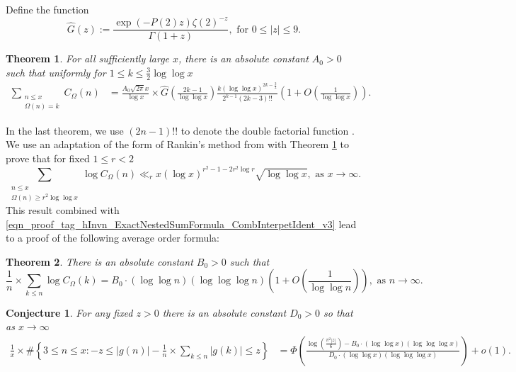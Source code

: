 \documentclass[11pt,reqno,a4letter]{article}
\newcommand{\hlocalref}[1]{\hyperref[#1]{\ref{#1}}}
\numberwithin{equation}{section}
\numberwithin{figure}{section}
\numberwithin{table}{section}
\newcommand{\seqnum}[1]{\href{http://oeis.org/#1}{\color{ProcessBlue}{\underline{#1}}}}
\theoremstyle{plain}
\newtheorem{theorem}{Theorem}
\numberwithin{theorem}{section}
\newtheorem*{conjecture*}{Conjecture}
\theoremstyle{definition}
\begin{document}
Define the function 
\[
\widehat{G}(z) := \frac{\exp\left(-P(2) z\right) \zeta(2)^{-z}}{\Gamma(1+z)}, \text{ for } 
     0 \leq |z| \leq 9.
\]

\begin{theorem} 
\label{cor_SummatoryFuncsOfUnsignedSeqs_v2} 
For all sufficiently large $x$, there is an absolute constant $A_0 > 0$ such that 
uniformly for $1 \leq k \leq \frac{3}{2} \log\log x$  
\begin{align*} 
\sum_{\substack{n \leq x \\ \Omega(n)=k}} C_{\Omega}(n) & = 
     \frac{A_0 \sqrt{2\pi} x}{\log x} \times  
     \widehat{G}\left(\frac{2k-1}{\log\log x}\right) 
     \frac{k (\log\log x)^{2k-\frac{3}{2}}}{2^{k-1} (2k-3)!!} \left( 
     1 + O\left(\frac{1}{\log\log x}\right)\right). 
\end{align*} 
\end{theorem} 

In the last theorem, we use $(2n-1)!!$ to denote the 
double factorial function \cite[\seqnum{A001147}]{OEIS}. 
We use an adaptation of the form of Rankin's method from \cite[Thm.~7.20]{MV} 
with Theorem \hlocalref{cor_SummatoryFuncsOfUnsignedSeqs_v2} 
to prove that for fixed $1 \leq r < 2$ 
\[
\sum_{\substack{n \leq x \\ \Omega(n) \geq r^2 \log\log x}} \log C_{\Omega}(n) \ll_r 
     x (\log x)^{r^2-1-2r^2\log r} \sqrt{\log\log x}, \text{ as } 
     x \rightarrow \infty. 
\]
This result combined with \eqref{eqn_proof_tag_hInvn_ExactNestedSumFormula_CombInterpetIdent_v3} 
lead to a proof of the following average order formula: 

\begin{theorem} 
\label{lemma_HatCAstxSum_ExactFormulaWithError_v1} 
There is an absolute constant $B_0 > 0$ such that 
\[
\frac{1}{n} \times \sum_{k \leq n} \log C_{\Omega}(k) = 
     B_0 \cdot (\log\log n)(\log\log\log n) \left(1 + 
     O\left(\frac{1}{\log\log n}\right)\right), 
     \text{ as } n \rightarrow \infty. 
\] 
\end{theorem} 

\begin{conjecture*}
For any fixed $z > 0$ there is an absolute constant $D_0 > 0$ so that 
as $x \rightarrow \infty$ 
\begin{align*} 
\frac{1}{x} \times \#\left\{3 \leq n \leq x: -z \leq |g(n)| - 
     \frac{1}{n} \times \sum_{k \leq n} |g(k)| \leq z\right\} & = 
	\Phi\left(\frac{\log\left(\frac{\pi^2 |z|}{6}\right)-B_0 \cdot (\log\log x) (\log\log\log x)}{ 
	D_0 \cdot (\log\log x)(\log\log\log x)}\right) + o(1).
\end{align*} 
\end{conjecture*}
\end{document}

